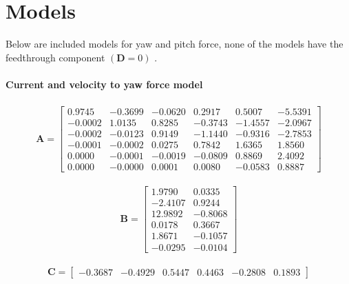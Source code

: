 \chapter{Models}
Below are included models for yaw and pitch force, none of the models have the feedthrough component  $\left( \mathbf{D} = 0 \right)$ .
\subsubsection{Current and velocity to yaw force model}

\begin{align}
\mathbf{A} = \begin{bmatrix}
    0.9745 &  -0.3699 & -0.0620 &   0.2917 &   0.5007 &  -5.5391 \\
   -0.0002 &   1.0135 &  0.8285 &  -0.3743 &  -1.4557 &  -2.0967 \\
   -0.0002 &  -0.0123 &  0.9149 &  -1.1440 &  -0.9316 &  -2.7853 \\
   -0.0001 &  -0.0002 &  0.0275 &   0.7842 &   1.6365 &   1.8560 \\
    0.0000 &  -0.0001 & -0.0019 &  -0.0809 &   0.8869 &   2.4092 \\
    0.0000 &  -0.0000 &  0.0001 &   0.0080 &  -0.0583 &   0.8887 
     \end{bmatrix}
\end{align}

\begin{align}
\mathbf{B} = \begin{bmatrix}
    1.9790  &   0.0335\\
   -2.4107  &   0.9244\\
   12.9892 &   -0.8068\\
    0.0178  &  0.3667\\
    1.8671  &  -0.1057\\
   -0.0295  &  -0.0104
     \end{bmatrix}
\end{align}

\begin{align}
\mathbf{C} = \begin{bmatrix}
   -0.3687  & -0.4929    &0.5447   & 0.4463   &-0.2808    &0.1893
     \end{bmatrix}
\end{align}

